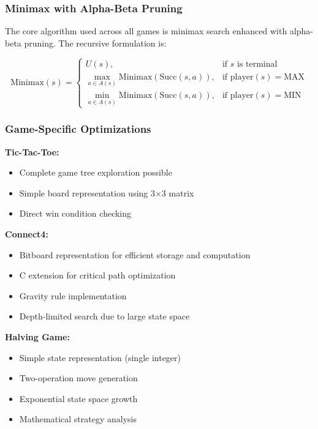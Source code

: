\documentclass[12pt]{article}
\begin{document}
\subsubsection{Minimax with Alpha-Beta Pruning}

The core algorithm used across all games is minimax search enhanced with alpha-beta pruning. The recursive formulation is:

\[
\text{Minimax}(s) =
\begin{cases}
U(s), & \text{if } s \text{ is terminal} \\
\max_{a \in A(s)} \text{Minimax}(\text{Succ}(s, a)), & \text{if } \text{player}(s) = \text{MAX} \\
\min_{a \in A(s)} \text{Minimax}(\text{Succ}(s, a)), & \text{if } \text{player}(s) = \text{MIN}
\end{cases}
\]

\subsubsection{Game-Specific Optimizations}

\textbf{Tic-Tac-Toe:}
\begin{itemize}
    \item Complete game tree exploration possible
    \item Simple board representation using 3×3 matrix
    \item Direct win condition checking
\end{itemize}

\textbf{Connect4:}
\begin{itemize}
    \item Bitboard representation for efficient storage and computation
    \item C extension for critical path optimization
    \item Gravity rule implementation
    \item Depth-limited search due to large state space
\end{itemize}

\textbf{Halving Game:}
\begin{itemize}
    \item Simple state representation (single integer)
    \item Two-operation move generation
    \item Exponential state space growth
    \item Mathematical strategy analysis
\end{itemize}
\end{document}
